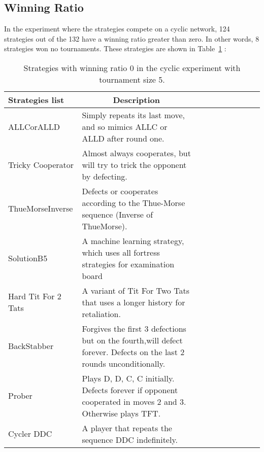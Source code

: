 \subsection{Winning Ratio}
\label{sub:winning-ratio}

In the experiment where the
strategies compete on a cyclic network, 124 strategies out of the 132 have a
winning ratio greater than zero. In other words, 8 strategies won no
tournaments. These strategies are shown in Table~\ref{winning-ratio-zero-cyclic-five} :

\begin{table}[h]
\centering
\begin{adjustbox}{width=1\textwidth}
\small
\begin{tabular}{@{}|l|l|l|l|l|l|l|l|l|l|@{}}
\toprule
\hline
Strategies list & \multicolumn{1}{c|}{Description}                                                                                                                    \\ \hline
ALLCorALLD          & Simply repeats its last move, and so mimics ALLC or ALLD after round one.                                                                           \\ \hline
Tricky Cooperator   & Almost always cooperates, but will try to trick the opponent by defecting.                                                                          \\ \hline
ThueMorseInverse    & Defects or cooperates according to the Thue-Morse sequence (Inverse of ThueMorse).                        \\ \hline
SolutionB5          & A machine learning strategy, which uses all fortress strategies for examination board                                                                                                                                                   \\ \hline
Hard Tit For 2 Tats & A variant of Tit For Two Tats that uses a longer history for retaliation.                                \\ \hline
BackStabber         & Forgives the first 3 defections but on the fourth,will defect forever. Defects on the last 2 rounds unconditionally.                                \\ \hline
Prober              & Plays D, D, C, C initially. Defects forever if opponent cooperated in moves 2 and 3. Otherwise plays TFT. \\ \hline
Cycler DDC          & A player that repeats the sequence DDC indefinitely.                                                                                                \\ \hline
\end{tabular}
\end{adjustbox}
\caption{Strategies with winning ratio 0 in the cyclic experiment with tournament
         size 5.}
\label{winning-ratio-zero-cyclic-five}
\end{table}

